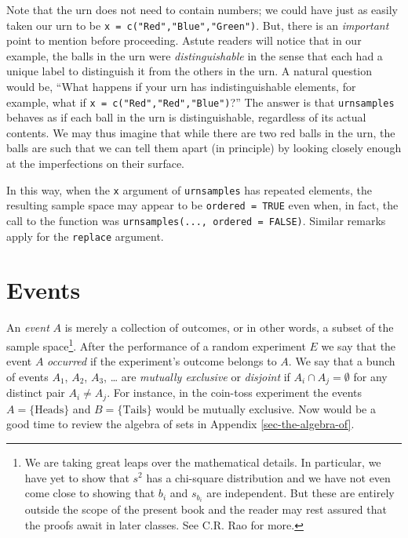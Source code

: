 \documentclass[]{book}
\let\rmarkdownfootnote\footnote%
\def\footnote{\protect\rmarkdownfootnote}
\numberwithin{equation}{chapter}
\numberwithin{figure}{chapter}
\theoremstyle{plain}
\theoremstyle{definition}
\theoremstyle{remark}
\theoremstyle{definition}
\theoremstyle{definition}
\theoremstyle{remark}
\begin{document}
Note that the urn does not need to contain numbers; we could have just
as easily taken our urn to be \texttt{x\ =\ c("Red","Blue","Green")}.
But, there is an \emph{important} point to mention before proceeding.
Astute readers will notice that in our example, the balls in the urn
were \emph{distinguishable} in the sense that each had a unique label to
distinguish it from the others in the urn. A natural question would be,
``What happens if your urn has indistinguishable elements, for example,
what if \texttt{x\ =\ c("Red","Red","Blue")}?'' The answer is that
\texttt{urnsamples} behaves as if each ball in the urn is
distinguishable, regardless of its actual contents. We may thus imagine
that while there are two red balls in the urn, the balls are such that
we can tell them apart (in principle) by looking closely enough at the
imperfections on their surface.

In this way, when the \texttt{x} argument of \texttt{urnsamples} has
repeated elements, the resulting sample space may appear to be
\texttt{ordered\ =\ TRUE} even when, in fact, the call to the function
was \texttt{urnsamples(...,\ ordered\ =\ FALSE)}. Similar remarks apply
for the \texttt{replace} argument.

\section{Events}\label{sec-events}

An \emph{event}  \(A\) is merely a collection of outcomes,
or in other words, a subset of the sample space\footnote{We are taking
  great leaps over the mathematical details. In particular, we have yet
  to show that \(s^{2}\) has a chi-square distribution and we have not
  even come close to showing that \(b_{i}\) and \(s_{b_{i}}\) are
  independent. But these are entirely outside the scope of the present
  book and the reader may rest assured that the proofs await in later
  classes. See C.R. Rao for more.}. After the performance of a random
experiment \(E\) we say that the event \(A\) \emph{occurred} if the
experiment's outcome belongs to \(A\). We say that a bunch of events
\(A_{1}\), \(A_{2}\), \(A_{3}\), \ldots{} are \emph{mutually exclusive}
 or \emph{disjoint} if
\(A_{i}\cap A_{j}=\emptyset\) for any distinct pair \(A_{i}\neq A_{j}\).
For instance, in the coin-toss experiment the events
\(A = \{ \mbox{Heads} \}\) and \(B = \{ \mbox{Tails} \}\) would be
mutually exclusive. Now would be a good time to review the algebra of
sets in Appendix \ref{sec-the-algebra-of}.
\end{document}
